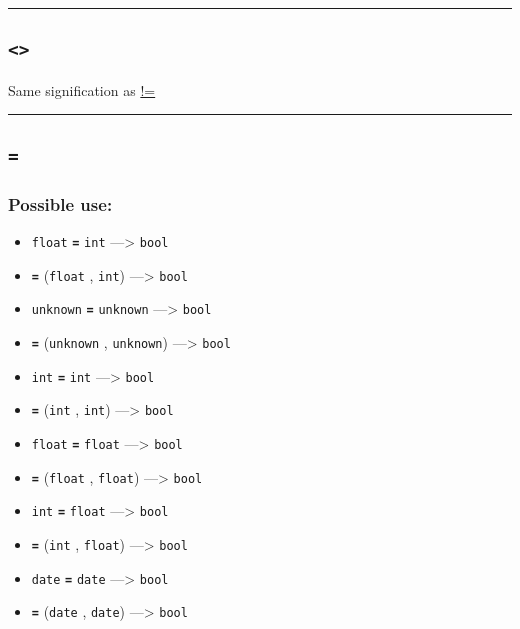 \documentclass[]{book}
\providecommand{\tightlist}{%
  \setlength{\itemsep}{0pt}\setlength{\parskip}{0pt}}
\theoremstyle{definition}
\theoremstyle{definition}
\theoremstyle{definition}
\theoremstyle{remark}
\begin{document}
\begin{center}\rule{0.5\linewidth}{\linethickness}\end{center}

\subsection{\texorpdfstring{\texttt{\textless{}\textgreater{}}}{\textless{}\textgreater{}}}\label{section-15}

Same signification as \href{operators-a-to-a.html\#!=}{!=}

\begin{center}\rule{0.5\linewidth}{\linethickness}\end{center}

\subsection{\texorpdfstring{\texttt{=}}{=}}\label{section-16}

\subsubsection{Possible use:}\label{possible-use-13}

\begin{itemize}
\tightlist
\item
  \texttt{float} \textbf{\texttt{=}} \texttt{int} ---\textgreater{}
  \texttt{bool}
\item
  \textbf{\texttt{=}} (\texttt{float} , \texttt{int}) ---\textgreater{}
  \texttt{bool}
\item
  \texttt{unknown} \textbf{\texttt{=}} \texttt{unknown}
  ---\textgreater{} \texttt{bool}
\item
  \textbf{\texttt{=}} (\texttt{unknown} , \texttt{unknown})
  ---\textgreater{} \texttt{bool}
\item
  \texttt{int} \textbf{\texttt{=}} \texttt{int} ---\textgreater{}
  \texttt{bool}
\item
  \textbf{\texttt{=}} (\texttt{int} , \texttt{int}) ---\textgreater{}
  \texttt{bool}
\item
  \texttt{float} \textbf{\texttt{=}} \texttt{float} ---\textgreater{}
  \texttt{bool}
\item
  \textbf{\texttt{=}} (\texttt{float} , \texttt{float})
  ---\textgreater{} \texttt{bool}
\item
  \texttt{int} \textbf{\texttt{=}} \texttt{float} ---\textgreater{}
  \texttt{bool}
\item
  \textbf{\texttt{=}} (\texttt{int} , \texttt{float}) ---\textgreater{}
  \texttt{bool}
\item
  \texttt{date} \textbf{\texttt{=}} \texttt{date} ---\textgreater{}
  \texttt{bool}
\item
  \textbf{\texttt{=}} (\texttt{date} , \texttt{date}) ---\textgreater{}
  \texttt{bool}
\end{itemize}
\end{document}
